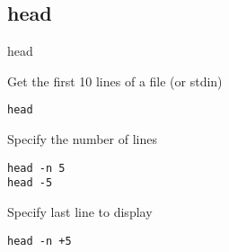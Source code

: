 \subsection{head}

\begin{frame}[fragile]{head}
  \begin{exampleblock}{Get the first 10 lines of a file (or stdin)}
    \begin{lstlisting}[showstringspaces=false,basicstyle=\tiny]
head
    \end{lstlisting}
  \end{exampleblock}
\pause

  \begin{exampleblock}{Specify the number of lines}
    \begin{lstlisting}[showstringspaces=false,basicstyle=\tiny]
head -n 5
head -5
    \end{lstlisting}
  \end{exampleblock}
\pause

  \begin{exampleblock}{Specify last line to display}
    \begin{lstlisting}[showstringspaces=false,basicstyle=\tiny]
head -n +5
    \end{lstlisting}
  \end{exampleblock}
\end{frame}

